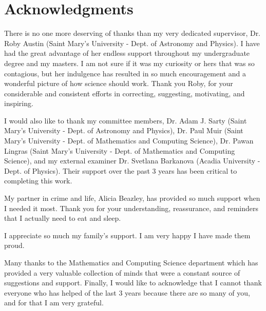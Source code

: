 \section*{Acknowledgments}\label{acknowledgments}
\thispagestyle{empty} %

There is no one more deserving of thanks than my very dedicated supervisor, Dr. Roby Austin (Saint Mary's University - Dept. of Astronomy and Physics).
I have had the great advantage of her endless support throughout my undergraduate degree and my masters.
I am not sure if it was my curiosity or hers that was so contagious, but her indulgence has resulted in so much encouragement and a wonderful picture of how science should work.
Thank you Roby, for your considerable and consistent efforts in correcting, suggesting, motivating, and inspiring.

I would also like to thank my committee members, Dr. Adam J. Sarty (Saint Mary's University - Dept. of Astronomy and Physics), Dr. Paul Muir (Saint Mary's University - Dept. of Mathematics and Computing Science), Dr. Pawan Lingras (Saint Mary's University - Dept. of Mathematics and Computing Science), and my external examiner Dr. Svetlana Barkanova (Acadia University - Dept. of Physics).
Their support over the past 3 years has been critical to completing this work.

My partner in crime and life, Alicia Beazley, has provided so much support when I needed it most.
Thank you for your understanding, reassurance, and reminders that I actually need to eat and sleep.

I appreciate so much my family's support.
I am very happy I have made them proud.

Many thanks to the Mathematics and Computing Science department which has provided a very valuable collection of minds that were a constant source of suggestions and support.
Finally, I would like to acknowledge that I cannot thank everyone who has helped of the last 3 years because there are so many of you, and for that I am very grateful.

